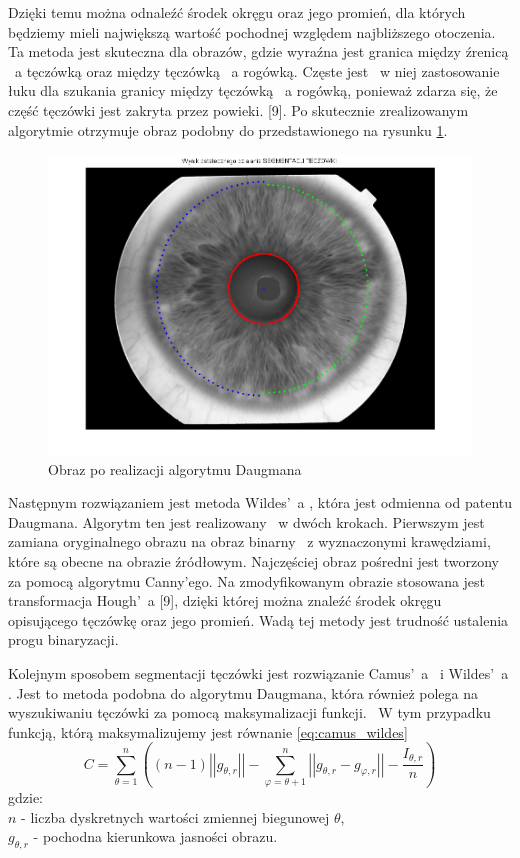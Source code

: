 Dzięki temu można odnaleźć środek okręgu oraz jego promień, dla których będziemy mieli największą wartość pochodnej względem najbliższego otoczenia. Ta metoda jest skuteczna dla obrazów, gdzie wyraźna jest granica między źrenicą ~a tęczówką oraz między tęczówką ~a rogówką. Częste jest ~w niej zastosowanie łuku dla szukania granicy między tęczówką ~a rogówką, ponieważ zdarza się, że część tęczówki jest zakryta przez powieki. [9]. Po skutecznie zrealizowanym algorytmie otrzymuje obraz podobny do przedstawionego na rysunku \ref{fig:przykladDaugman}.
\begin{figure}
\begin{center}
\includegraphics[scale=0.5]{calosc.png}
\caption{Obraz po realizacji algorytmu Daugmana}
\label{fig:przykladDaugman}
\end{center}
\end{figure}

Następnym rozwiązaniem jest metoda Wildes'~a \cite{Wildes}, która jest odmienna od patentu Daugmana. Algorytm ten jest realizowany ~w dwóch krokach. Pierwszym jest zamiana oryginalnego obrazu na obraz binarny ~z wyznaczonymi krawędziami, które są obecne na obrazie źródłowym. Najczęściej obraz pośredni jest tworzony za pomocą algorytmu Canny'ego. Na zmodyfikowanym obrazie stosowana jest transformacja Hough'~a [9], dzięki której można znaleźć środek okręgu opisującego tęczówkę oraz jego promień. Wadą tej metody jest trudność ustalenia progu binaryzacji.

Kolejnym sposobem segmentacji tęczówki jest rozwiązanie Camus'~a ~i Wildes'~a \cite{Camus}. Jest to metoda podobna do algorytmu Daugmana, która również polega na wyszukiwaniu tęczówki za pomocą maksymalizacji funkcji. ~W tym przypadku funkcją, którą maksymalizujemy jest równanie \ref{eq:camus_wildes} 
\begin{equation}
\label{eq:camus_wildes}
C=\sum_{\theta =1}^{n} ((n-1)\left|\left| g_{\theta,r} \right|\right| - \sum_{\varphi=\theta + 1 } ^{n} \left| \left| g_{\theta,r} - g_{\varphi,r} \right| \right| - \frac{I_{\theta,r}}{n}  )
\end{equation}
gdzie:\\
$ n $ - liczba dyskretnych wartości zmiennej biegunowej $ \theta $, \\
$ g_{\theta, r} $ - pochodna kierunkowa jasności obrazu.


